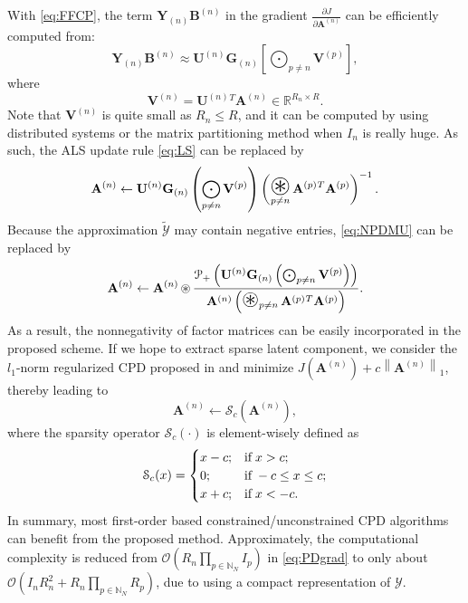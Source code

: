 \documentclass[10pt,twocolumn,twoside]{IEEEtran}
\newcommand{\tensor}[1]{\ensuremath{\boldsymbol{\mathscr{#1}}}}
\newcommand{\tenmat}[2][n]{\ensuremath{{\mathbf{#2}}_{(#1)}}}
\newcommand{\matn}[2][n]{\ensuremath{\mathbf{#2}^{(#1)}}}
\newcommand{\Real}{\ensuremath{\mathbb{R}}}
\newcommand{\Natural}{\ensuremath{\mathbb{N}}}
\newcommand{\fpartial}[2]{\ensuremath{\frac{\partial #1}{\partial #2}}}
\DeclareMathOperator*{\hdp}{{\circledast}}     \DeclareMathOperator*{\bigkkp}{{\bigotimes}}         \DeclareMathOperator*{\bigkrp}{{\bigodot}}
\DeclareMathOperator*{\bighdp}{\mathlarger{\mathlarger{\mathlarger{\mathlarger{\circledast}}}}}     \DeclareMathOperator*{\tentimes}{{\times}}
\newcommand{\frob}[2][F]{\ensuremath{\left\|#2\right\|_{#1}}}
\renewcommand{\from}{\ensuremath{\leftarrow}}
\newcommand{\bigO}[1]{\ensuremath{\mathcal{O}(#1)}}
\newcommand{\proj}{\ensuremath{\mathcal{P}}}
\begin{document}
With \eqref{eq:FFCP}, the term $\tenmat{Y}\matn{B}$ in the gradient $\fpartial{J}{\matn{A}}$ can be efficiently computed from: \begin{equation}
\label{eq:FFCPYB}
\tenmat{Y}\matn{B}\approx\matn{U}\tenmat{G}\left[\bigkrp\nolimits_{p\neq n}{\matn[p]{V}}\right],
\end{equation}
where
\begin{equation}
\label{eq:FFCPCmat}
\matn{V}=\matn{U}{}^T\matn{A}\in\Real^{R_n\times R}.
\end{equation}
Note that \matn{V} is quite small as $R_n\le R$, and  it can be computed by using distributed systems or the matrix partitioning method when $I_n$ is really huge. 
As such, the ALS update rule \eqref{eq:LS} can be replaced by
\begin{equation}
\label{eq:LRALS}
\matn{A}\from\matn{U}\tenmat{G}\left(\bigkrp_{p\neq n}{\matn[p]{V}}\right)\left(\bighdp_{p\neq n}\matn[p]{A}{}^T\matn[p]{A}\right)^{-1}.
\end{equation}
Because the approximation \tensor{\tilde{Y}} may contain negative entries, \eqref{eq:NPDMU} can be replaced by
\begin{equation}
\label{eq:LRANPD}
\matn{A}\from\matn{A}\hdp\frac{\proj_+\left(\matn{U}\tenmat{G}\left(\bigkrp\nolimits_{p\neq n}{\matn[p]{V}}\right)\right)}{\matn{A}\left(\bighdp_{p\neq n}\matn[p]{A}{}^T\matn[p]{A}\right)}.
\end{equation}
As a result, the nonnegativity of factor matrices can be easily incorporated in the proposed scheme. If we hope to extract sparse latent component, we consider the $l_1$-norm regularized CPD proposed in \cite{CP_L1} and minimize $J(\matn{A})+c\frob[1]{\matn{A}}$, thereby leading to
\begin{equation}
\label{eq:CPL1}
\matn{A}\from\mathcal{S}_{c}(\matn{A}),
\end{equation}
where the sparsity operator $\mathcal{S}_c(\cdot)$ is element-wisely defined as
\begin{equation}
\notag
\label{eq:Sparsity}
\mathcal{S}_c(x)=\begin{cases}
x-c; & \text{if}\; x>c; \\
0; & \text{if}\; -c\le x\le c; \\
x+c; & \text{if} \; x<-c.
\end{cases}
\end{equation}
 In summary, most first-order based constrained/unconstrained CPD algorithms can benefit from the proposed method. Approximately, the computational complexity is reduced from \bigO{R_n\prod_{p\in\Natural_N}I_p} in \eqref{eq:PDgrad} to only  about \bigO{I_nR_n^2+R_n\prod_{p\in\Natural_N}R_p}, due to using a compact representation of \tensor{Y}. 
 
\end{document}
